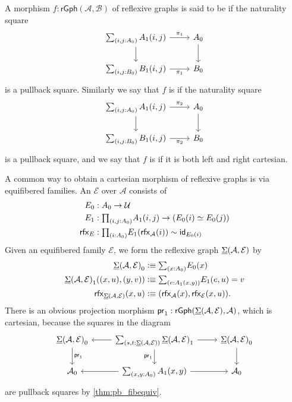 \begin{defn}
A morphism $f:\mathsf{rGph}(\mathcal{A},\mathcal{B})$ of reflexive graphs is said to be  if the naturality square
\begin{equation*}
\begin{tikzcd}
\sm{i,j:\pts{A}}\edg{A}(i,j) \arrow[d] \arrow[r,"\pi_1"] & \pts{A} \arrow[d] \\
\sm{i,j:\pts{B}}\edg{B}(i,j) \arrow[r,swap,"\pi_1"] & \pts{B}
\end{tikzcd}
\end{equation*}
is a pullback square. Similarly we say that $f$ is  if the naturality square
\begin{equation*}
\begin{tikzcd}
\sm{i,j:\pts{A}}\edg{A}(i,j) \arrow[d] \arrow[r,"\pi_2"] & \pts{A} \arrow[d] \\
\sm{i,j:\pts{B}}\edg{B}(i,j) \arrow[r,swap,"\pi_2"] & \pts{B}
\end{tikzcd}
\end{equation*}
is a pullback square, and we say that $f$ is  if it is both left and right cartesian.
\end{defn}

\begin{eg}
A common way to obtain a cartesian morphism of reflexive graphs is via equifibered families.
An  $\mathcal{E}$ over $\mathcal{A}$ consists of
\begin{align*}
\pts{E} & : \pts{A}\to\UU \\
\edg{E} & : \prd{i,j:\pts{A}} \edg{A}(i,j)\to (\eqv{\pts{E}(i)}{\pts{E}(j)}) \\
\rfx{E} & : \prd{i:\pts{A}} \edg{E}(\rfx{\mathcal{A}}(i))\htpy \idfunc[\pts{E}(i)]
\end{align*}
Given an equifibered family $\mathcal{E}$, we form the reflexive graph $\underline{\Sigma}(\mathcal{A},\mathcal{E})$ by
\begin{align*}
\pts{\msm{\mathcal{A}}{\mathcal{E}}} & \defeq \sm{x:\pts{A}}\pts{E}(x) \\
\edg{\msm{\mathcal{A}}{\mathcal{E}}}((x,u),(y,v)) & \defeq \sm{e:\edg{A}(x,y)} \edg{E}(e,u) = v \\
\rfx{\msm{\mathcal{A}}{\mathcal{E}}}(x,u) & \defeq (\rfx{\mathcal{A}}(x),\rfx{\mathcal{E}}(x,u)).
\end{align*}
There is an obvious projection morphism $\mathsf{pr}_{1} : \mathsf{rGph}(\underline{\Sigma}(\mathcal{A},\mathcal{E}),\mathcal{A})$, which is cartesian, because the squares in the diagram
\begin{equation*}
\begin{tikzcd}
\pts{\msm{\mathcal{A}}{\mathcal{E}}} \arrow[d,"\proj 1"] & \sm{s,t:\msm{\mathcal{A}}{\mathcal{E}}}\edg{\msm{\mathcal{A}}{\mathcal{E}}} \arrow[l] \arrow[r] \arrow[d,swap,"\proj 1"] & \pts{\msm{\mathcal{A}}{\mathcal{E}}} \arrow[d] \\
\pts{\mathcal{A}} & \sm{x,y:\pts{A}}\edg{A}(x,y) \arrow[l] \arrow[r] & \pts{\mathcal{A}}
\end{tikzcd}
\end{equation*}
are pullback squares by \cref{thm:pb_fibequiv}.
\end{eg}


